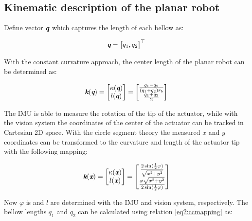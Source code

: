 \subsection{Kinematic description of the planar robot}

Define vector $\textit{\textbf{q}}$ which captures the length of each bellow as:

\begin{equation}
    \textit{\textbf{q}} = \begin{bmatrix} q_1 , q_2 \end{bmatrix} ^\top
\end{equation}

With the constant curvature approach, the center length of the planar robot can be determined as:


\begin{equation}
    \textit{\textbf{k}}(\textit{\textbf{q}}) = \begin{bmatrix}  \kappa(\textit{\textbf{q}}) \\ l(\textit{\textbf{q}}) \end{bmatrix} = \begin{bmatrix} \frac{q_1-q_2}{(q_1+q_2)r_b} \\ \frac{q_1+q_2}{2} \end{bmatrix}
    \label{eq2:ccmapping}
\end{equation}

The IMU is able to measure the rotation of the tip of the actuator, while with the vision system the coordinates of the center of the actuator can be tracked in Cartesian 2D space. With the circle segment theory the measured $x$ and $y$ coordinates can be transformed to the curvature and length of the actuator tip with the following mapping:

\begin{equation}
    \textit{\textbf{k}}(\textit{\textbf{x}}) = \begin{bmatrix} \kappa(\textit{\textbf{x}}) \\ l(\textit{\textbf{x}}) \end{bmatrix} = \begin{bmatrix} \frac{2 \sin (\frac{1}{2}\varphi)}{\sqrt{x^2+y^2}} \\
    \frac{\varphi \sqrt{x^2+y^2}}{2 \sin(\frac{1}{2}\varphi)} \end{bmatrix}
\end{equation}

Now $\varphi$ is and $l$ are determined with the IMU and vision system, respectively. The bellow lengths $q_1$ and $q_2$ can be calculated using relation \ref{eq2:ccmapping} as:

